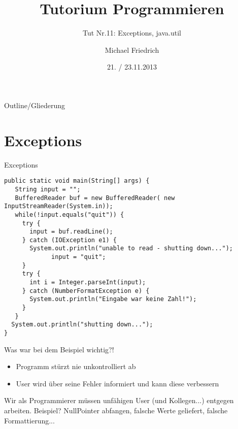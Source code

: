 \documentclass[18pt]{beamer}
\title[Prog Tut Nr. 11]{Tutorium Programmieren}
\subtitle{Tut Nr.11: Exceptions, java.util}
\author{Michael Friedrich}
\date{21. / 23.11.2013}
\institute{Institut f\"ur theoretische Informatik}
\begin{document}

\begin{frame}
	\titlepage
\end{frame}

\begin{frame}{Outline/Gliederung}

	\tableofcontents
\end{frame}

\section{Exceptions}
\begin{frame}[fragile]{Exceptions}
\begin{lstlisting}
public static void main(String[] args) {
   String input = "";
   BufferedReader buf = new BufferedReader( new InputStreamReader(System.in));
   while(!input.equals("quit")) {  
     try {
       input = buf.readLine();
     } catch (IOException e1) {
       System.out.println("unable to read - shutting down...");
			 input = "quit";
     }
     try {
       int i = Integer.parseInt(input);
     } catch (NumberFormatException e) {
       System.out.println("Eingabe war keine Zahl!");
     }
   }
  System.out.println("shutting down...");
}\end{lstlisting}
\end{frame}

\begin{frame}{Was war bei dem Beispiel wichtig?!}
\pause
\begin{itemize}
	\item Programm stürzt nie unkontrolliert ab \pause
	\item User wird über seine Fehler informiert und kann diese verbessern  \pause
\end{itemize} \pause
Wir als Programmierer müssen unfähigen User (und Kollegen...) entgegen arbeiten. \newline  
Beispiel?  \pause NullPointer abfangen, falsche Werte geliefert, falsche Formattierung...

\end{frame}
\end{document}
